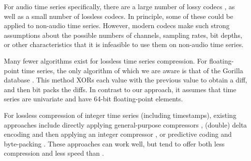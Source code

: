 
For audio time series specifically, there are a large number of lossy codecs \cite{vorbis, shorten, aac, opus}, as well as a small number of lossless \cite{flac, alac} codecs. In principle, some of these could be applied to non-audio time series. However, modern codecs make such strong assumptions about the possible numbers of channels, sampling rates, bit depths, or other characteristics that it is infeasible to use them on non-audio time series.

Many fewer algorithms exist for lossless time series compression. For floating-point time series, the only algorithm of which we are aware is that of the Gorilla database \cite{gorilla}. This method XORs each value with the previous value to obtain a diff, and then bit packs the diffs. In contrast to our approach, it assumes that time series are univariate and have 64-bit floating-point elements. %

For lossless compression of integer time series (including timestamps), existing approaches include directly applying general-purpose compressors \cite{respawnDB, openTSDB, chronicleDB, kairosDB, druid}, (double) delta encoding and then applying an integer compressor \cite{influxDB, gorilla}, or predictive coding and byte-packing \cite{akumuli}. These approaches can work well, but tend to offer both less compression and less speed than \mine.



